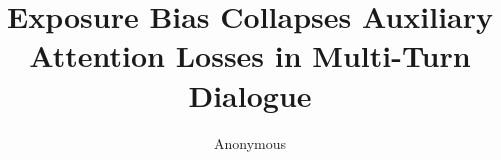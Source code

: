 \documentclass[11pt]{article}
\title{Exposure Bias Collapses Auxiliary Attention Losses in Multi-Turn Dialogue}
\author{Anonymous}
\begin{document}
\maketitle







\FloatBarrier






\raggedbottom
\appendix
\renewcommand{\thesection}{\AlphAlph{\value{section}}}

\end{document}
